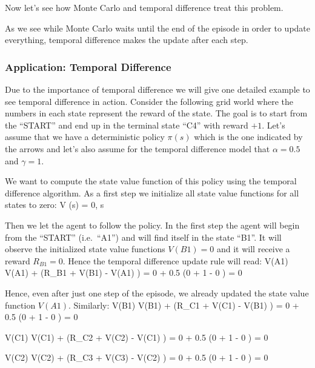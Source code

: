 Now let's see how Monte Carlo and temporal difference treat this problem.


As we see while Monte Carlo waits until the end of the episode in order to update everything, temporal difference
makes the update after each step.
\ee

\subsubsection*{Application: Temporal Difference}

Due to the importance of temporal difference we will give one detailed example to see temporal difference in action.
Consider the following grid world where the numbers in each state represent the reward of the state. The goal is to
start from the ``START'' and end up in the terminal state ``C4'' with reward $+1$. Let's assume that we have a
deterministic policy $\pi(s)$ which is the one indicated by the arrows and let's also assume for the temporal
difference model that $\alpha = 0.5$ and $\gamma = 1$.


We want to compute the state value function of this policy using the temporal difference algorithm. As a first step
we initialize all state value functions for all states to zero:
\bse
V (s) = 0, \forall s
\ese

Then we let the agent to follow the policy. In the first step the agent will begin from the ``START'' (i.e.\ ``A1'') and
will find itself in the state ``B1''. It will observe the initialized state value functions $V(B1) = 0$ and it will
receive a reward $R_{B1} = 0$. Hence the temporal difference update rule will read:
\bse
V(A1) \gets V(A1) + \alpha \left(R_{B1} + \gamma V(B1) - V(A1) \right) =
0 + 0.5 \cdot \left(0 + 1  - 0 \right) = 0
\ese

Hence, even after just one step of the episode, we already updated the state value function $V(A1)$. Similarly:
\bse
V(B1) \gets V(B1) + \alpha \left(R_{C1} + \gamma V(C1) - V(B1) \right) =
0 + 0.5 \cdot \left(0 + 1  - 0 \right) = 0
\ese

\bse
V(C1) \gets V(C1) + \alpha \left(R_{C2} + \gamma V(C2) - V(C1) \right) =
0 + 0.5 \cdot \left(0 + 1  - 0 \right) = 0
\ese

\bse
V(C2) \gets V(C2) + \alpha \left(R_{C3} + \gamma V(C3) - V(C2) \right) =
0 + 0.5 \cdot \left(0 + 1  - 0 \right) = 0
\ese

